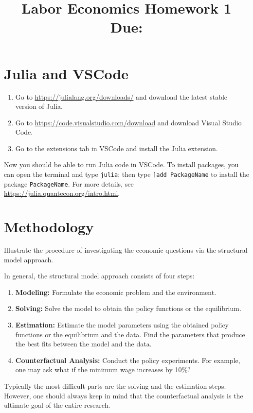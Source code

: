 \documentclass[12pt]{article}
\title{
    Labor Economics Homework 1 \\
    \large Due: \\
    }
\author{}
\date{}
\begin{document}

\maketitle
\vspace{-2cm}

\section{Julia and VSCode}
\begin{enumerate}
    \item Go to \url{https://julialang.org/downloads/} and download the latest stable version of Julia. 
    \item Go to \url{https://code.visualstudio.com/download} and download Visual Studio Code.
    \item Go to the extensions tab in VSCode and install the Julia extension.
\end{enumerate}
Now you should be able to run Julia code in VSCode. To install 
packages, you can open the terminal and type \texttt{julia}; then 
type \texttt{]add PackageName} to install the package 
\texttt{PackageName}. For more details, see 
\url{https://julia.quantecon.org/intro.html}.

\section{Methodology}
Illustrate the procedure of investigating the economic 
questions via the structural model approach.

\begin{sol}[2]
    In general, the structural model approach consists of four 
    steps:
    \begin{enumerate}
        \item \textbf{Modeling:} Formulate the economic problem 
        and the environment. 
        \item \textbf{Solving:} Solve the model to obtain the 
        policy functions or the equilibrium. 
        \item \textbf{Estimation:} Estimate the model parameters
        using the obtained policy functions or the equilibrium and 
        the data. Find the parameters that produce the best fits 
        between the model and the data. 
        \item \textbf{Counterfactual Analysis:} Conduct the 
        policy experiments. For example, one may ask what if 
        the minimum wage increases by 10\%?
    \end{enumerate}
    Typically the most difficult parts are the solving and the estimation 
    steps. However, one should always keep in mind that the 
    counterfactual analysis is the ultimate goal of the entire 
    research.
\end{sol}
\end{document}
